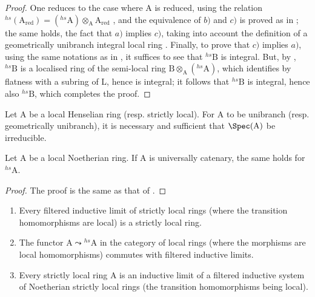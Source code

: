 \begin{proof}
One reduces to the case where A is reduced, using the relation ${}^{hs}(\mathrm{A}_{\mathrm{red}})=({}^{hs}\!\mathrm{A})\otimes_{\mathrm{A}}\mathrm{A}_{\mathrm{red}}$ , and the equivalence of $b)$ and $c)$ is proved as in ;
the same holds, the fact that $a)$ implies $c)$, taking into account the definition of a geometrically unibranch integral local ring .
Finally, to prove that $c)$ implies $a)$, using the same notations as in , it suffices to see that ${}^{hs}\!\mathrm{B}$ is integral.
But, by , ${}^{hs}\!\mathrm{B}$ is a localised ring of the semi-local ring $\mathrm{B}\otimes_{\mathrm{A}}({}^{hs}\!\mathrm{A})$, which identifies by flatness with a subring of L, hence is integral;
it follows that ${}^{hs}\!\mathrm{B}$ is integral, hence also ${}^{hs}\!\mathrm{B}$, which completes the proof.
\end{proof}

\begin{corollary}[18.8.16]
\label{IV.18.8.16}
Let $\mathrm{A}$ be a local Henselian ring (resp. strictly local).
For A to be unibranch (resp. geometrically unibranch), it is necessary and sufficient that $\Spec(\mathrm{A})$ be irreducible.
\end{corollary}

\begin{proposition}[18.8.17]
\label{IV.18.8.17}
Let $\mathrm{A}$ be a local Noetherian ring.
If A is universally catenary, the same holds for ${}^{hs}\!\mathrm{A}$.
\end{proposition}

\begin{proof}
The proof is the same as that of .
\end{proof}

\begin{proposition}[18.8.18]
\label{IV.18.8.18}
\begin{enumerate}[label=\emph{\roman*)}]
  \item Every filtered inductive limit of strictly local rings (where the transition homomorphisms are local) is a strictly local ring.
  \item The functor $\mathrm{A}\leadsto{}^{hs}\!\mathrm{A}$ in the category of local rings (where the morphisms are local homomorphisms) commutes with filtered inductive limits.
  \item Every strictly local ring A is an inductive limit of a filtered inductive system of Noetherian strictly local rings (the transition homomorphisms being local).
\end{enumerate}
\end{proposition}

